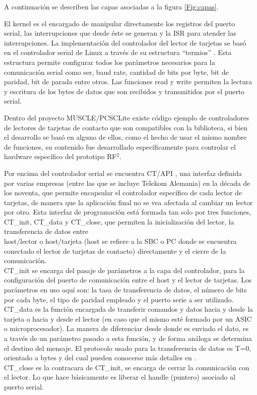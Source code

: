 \bigskip
A continuación se describen las capas asociadas a la figura \ref{Fig:capas}.

\bigskip
{}
El kernel es el encargado de manipular directamente los registros del puerto serial, las interrupciones que desde éste se generan y la ISR para atender las interrupciones.
La implementación del controlador del lector de tarjetas se basó en el controlador serial de Linux a través de su estructura “termios” \cite{termios}. Esta estructura permite configurar todos los parámetros necesarios para la comunicación serial como ser, baud rate, cantidad de bits por byte, bit de paridad, bit de parada entre otros. Las funciones read y write permiten la lectura y escritura de los bytes de datos que son recibidos y transmitidos por el puerto serial.

Dentro del proyecto MUSCLE/PCSCLite existe código ejemplo de controladores de lectores de tarjetas de contacto que son compatibles con la biblioteca, si bien el desarrollo se basó en alguno de ellos, como el hecho de usar el mismo nombre de funciones, su contenido fue desarrollado específicamente para controlar el hardware específico del prototipo RF$^{2}$.

\bigskip
{}
Por encima del controlador serial se encuentra CT/API \cite{ctapi}, una interfaz definida por varias empresas (entre las que se incluye Telekom Alemania) en la década de los noventa, que permite encapsular el controlador específico de cada lector de tarjetas, de manera que la aplicación final no se vea afectada al cambiar un lector por otro.
Esta interfaz de programación está formada tan solo por tres funciones, CT\_init, CT\_data y CT\_close, que permiten la inicialización del lector, la transferencia de datos entre \\
host/lector o host/tarjeta (host se refiere a la SBC o PC donde se encuentra conectado el lector de tarjetas de contacto) directamente y el cierre de la comunicación.\\
CT\_init se encarga del pasaje de parámetros a la capa del controlador, para la configuración del puerto de comunicación entre el host y el lector de tarjetas. Los parámetros en uso aquí son: la tasa de transferencia de datos, el número de bits por cada byte, el tipo de paridad empleado y el puerto serie a ser utilizado.\\
CT\_data es la función encargada de transferir comandos y datos hacia y desde la tarjeta o hacia y desde el lector (en caso que el mismo esté formado por un ASIC o microprocesador). La manera de diferenciar desde donde es enviado el dato, es a través de un parámetro pasado a esta función, y de forma análoga se determina el destino del mensaje. El protocolo usado para la transferencia de datos es T=0, orientado a bytes y del cual pueden conocerse más detalles en \cite{SCHb}.\\
CT\_close es la contracara de  CT\_init, se encarga de cerrar la comunicación con el lector. Lo que hace básicamente es liberar el handle (puntero) asociado al puerto serial.

